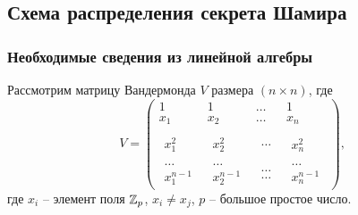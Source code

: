 \subsection[Схема Шамира]{Схема распределения секрета Шамира}


\subsubsection{Необходимые сведения из линейной алгебры}

Рассмотрим матрицу Вандермонда $V$ размера $(n \times n)$, где
\[
    V = \left(\begin{array}{cccc}
        {1} & {1} & { \ldots } & {1} \\
        {x_{1} } & {x_{2} } & { \ldots } & {x_{n} } \\
        {\begin{array}{l} {} \\ {x_{1}^{2} } \end{array}} &
            {\begin{array}{l} {} \\ {x_{2}^{2} } \end{array}} &
            {\begin{array}{l} {} \\ { \ldots } \end{array}} &
            {\begin{array}{l} {} \\ {x_{n}^{2} } \end{array}} \\
        {\begin{array}{l} { \ldots } \\ {x_{1}^{n-1} } \end{array}} &
            {\begin{array}{l} { \ldots } \\ {x_{2}^{n-1} } \end{array}} &
            {\begin{array}{l} { \ldots } \\ { \ldots } \end{array}} &
            {\begin{array}{l} { \ldots } \\ {x_{n}^{n-1} } \end{array}}
    \end{array}\right),
\]
где $x_{i}$ -- элемент поля $\mathbb{Z}_{p}$, $x_{i} \ne x_{j}$, $p$ -- большое простое число.

